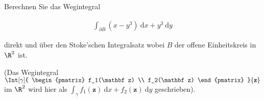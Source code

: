 
\begin{exercise}

Berechnen Sie das Wegintegral

\begin{align*}
    \int_{\partial B}
            (x - y^3)
            ~\mathrm d x
        +
        y^3
        ~\mathrm d y
\end{align*}

direkt und über den Stoke'schen Integralsatz wobei $B$ der offene Einheitskreis in $\R^2$ ist.

(Das Wegintegral
$\Int[\gamma]
{
    \begin{pmatrix}
        f_1(\mathbf z) \\
        f_2(\mathbf z)
    \end{pmatrix}
}{\mathbf z}$
im $\R^2$ wird hier als
$\int_\gamma
        f_1(\mathbf z)
        ~\mathrm d x
        +
    f_2(\mathbf z)
    ~\mathrm d y$
geschrieben).

\end{exercise}


